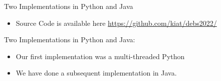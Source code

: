 \documentclass[9pt]{beamer}
\begin{document}
\begin{frame}[fragile,t ]{Two Implementations in Python and Java }
    \begin{itemize}
        \item  Source Code is available here \url{https://github.com/kiat/debs2022/}
  
    \end{itemize}
   \vspace*{1cm}


    Two Implementations in Python and Java:
    \begin{itemize}
        \item Our first implementation was a multi-threaded Python 
        \item We have done a subsequent implementation in Java.  
    \end{itemize}

    
    
    
\end{frame}


\end{document}
